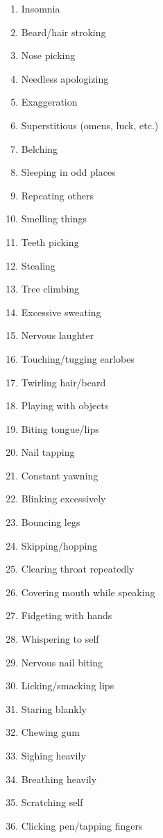 \documentclass[12pt]{book}
\begin{document}
\begin{multicols}{2}
\begin{enumerate}
        \item Insomnia
        \item Beard/hair stroking
        \item Nose picking
        \item Needless apologizing
        \item Exaggeration
        \item Superstitious (omens, luck, etc.)
        \item Belching
        \item Sleeping in odd places
        \item Repeating others
        \item Smelling things
        \item Teeth picking
        \item Stealing
        \item Tree climbing
        \item Excessive sweating
        \item Nervous laughter
        \item Touching/tugging earlobes
        \item Twirling hair/beard
        \item Playing with objects
        \item Biting tongue/lips
        \item Nail tapping
        \item Constant yawning
        \item Blinking excessively
        \item Bouncing legs
        \item Skipping/hopping
        \item Clearing throat repeatedly
        \item Covering mouth while speaking
        \item Fidgeting with hands
        \item Whispering to self
        \item Nervous nail biting
        \item Licking/smacking lips
        \item Staring blankly
        \item Chewing gum
        \item Sighing heavily
        \item Breathing heavily
        \item Scratching self
        \item Clicking pen/tapping fingers

\end{enumerate}
\end{multicols}
\end{document}
